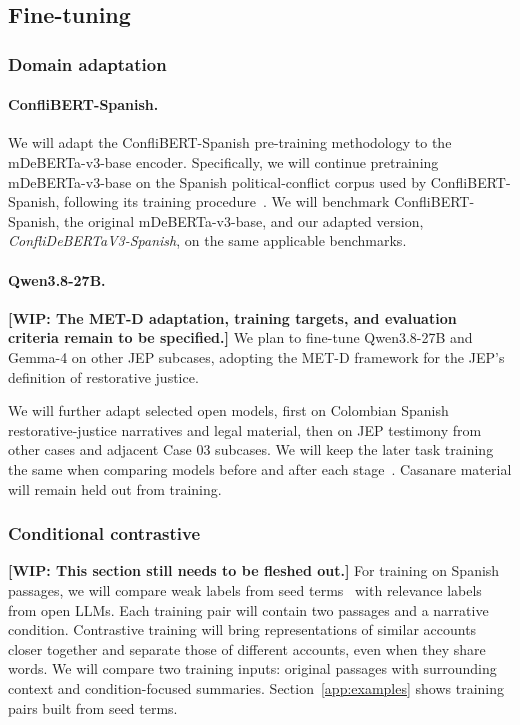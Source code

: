 \documentclass{article}
\begin{document}
\subsection{Fine-tuning}
\subsubsection{Domain adaptation}

\paragraph{ConfliBERT-Spanish.}
We will adapt the ConfliBERT-Spanish pre-training methodology to the mDeBERTa-v3-base encoder. Specifically, we will continue pretraining mDeBERTa-v3-base on the Spanish political-conflict corpus used by ConfliBERT-Spanish, following its training procedure~\cite{ConfliBERT-Spanish}. We will benchmark ConfliBERT-Spanish, the original mDeBERTa-v3-base, and our adapted version, \emph{ConfliDeBERTaV3-Spanish}, on the same applicable benchmarks.

\paragraph{Qwen3.8-27B.}
\noindent\textbf{[WIP: The MET-D adaptation, training targets, and evaluation criteria remain to be specified.]} We plan to fine-tune Qwen3.8-27B and Gemma-4 on other JEP subcases, adopting the MET-D framework for the JEP's definition of restorative justice.\par\smallskip

We will further adapt selected open models, first on Colombian Spanish restorative-justice narratives and legal material, then on JEP testimony from other cases and adjacent Case 03 subcases. We will keep the later task training the same when comparing models before and after each stage~\cite{DomainAdaptivePretraining}. Casanare material will remain held out from training.

\subsubsection{Conditional contrastive}
\noindent\textbf{[WIP: This section still needs to be fleshed out.]} For training on Spanish passages, we will compare weak labels from seed terms~\cite{XClass} with relevance labels from open LLMs. Each training pair will contain two passages and a narrative condition. Contrastive training will bring representations of similar accounts closer together and separate those of different accounts, even when they share words. We will compare two training inputs: original passages with surrounding context and condition-focused summaries. Section~\ref{app:examples} shows training pairs built from seed terms.
\end{document}
